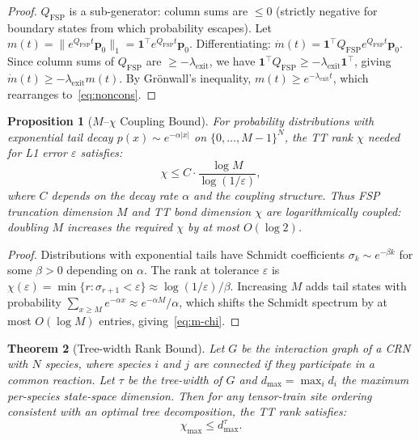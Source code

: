 \documentclass[11pt]{article}
\newtheorem{theorem}{Theorem}
\newtheorem{proposition}[theorem]{Proposition}
\newcommand{\norm}[1]{\lVert #1 \rVert}
\newcommand{\eps}{\varepsilon}
\begin{document}
\begin{proof}
$Q_{\mathrm{FSP}}$ is a sub-generator: column sums are $\leq 0$
(strictly negative for boundary states from which probability escapes).
Let $m(t) = \norm{e^{Q_{\mathrm{FSP}} t}\mathbf{p}_0}_1
= \mathbf{1}^\top e^{Q_{\mathrm{FSP}} t}\mathbf{p}_0$.
Differentiating: $\dot{m}(t) = \mathbf{1}^\top Q_{\mathrm{FSP}}
e^{Q_{\mathrm{FSP}} t}\mathbf{p}_0$.
Since column sums of $Q_{\mathrm{FSP}}$ are $\geq -\lambda_{\mathrm{exit}}$,
we have $\mathbf{1}^\top Q_{\mathrm{FSP}} \geq -\lambda_{\mathrm{exit}}
\mathbf{1}^\top$, giving $\dot{m}(t) \geq -\lambda_{\mathrm{exit}} m(t)$.
By Gr\"onwall's inequality, $m(t) \geq e^{-\lambda_{\mathrm{exit}} t}$,
which rearranges to~\eqref{eq:noncons}.
\end{proof}

\begin{proposition}[$M$--$\chi$ Coupling Bound]\label{prop:m-chi}
For probability distributions with exponential tail decay
$p(x) \sim e^{-\alpha|x|}$ on $\{0,\ldots,M{-}1\}^N$,
the TT rank $\chi$ needed for L1 error $\eps$ satisfies:
\begin{equation}\label{eq:m-chi}
  \chi \leq C \cdot \frac{\log M}{\log(1/\eps)},
\end{equation}
where $C$ depends on the decay rate $\alpha$ and the coupling
structure.
Thus FSP truncation dimension $M$ and TT bond dimension $\chi$
are \emph{logarithmically coupled}: doubling $M$ increases the
required $\chi$ by at most $O(\log 2)$.
\end{proposition}

\begin{proof}
Distributions with exponential tails have Schmidt coefficients
$\sigma_k \sim e^{-\beta k}$ for some $\beta > 0$ depending on
$\alpha$.
The rank at tolerance $\eps$ is
$\chi(\eps) = \min\{r : \sigma_{r+1} < \eps\}
\approx \log(1/\eps)/\beta$.
Increasing $M$ adds tail states with probability
$\sum_{x \geq M} e^{-\alpha x} \approx e^{-\alpha M}/\alpha$,
which shifts the Schmidt spectrum by at most
$O(\log M)$ entries, giving~\eqref{eq:m-chi}.
\end{proof}

\begin{theorem}[Tree-width Rank Bound]\label{thm:treewidth}
Let $G$ be the interaction graph of a CRN with $N$ species,
where species $i$ and $j$ are connected if they participate in
a common reaction.
Let $\tau$ be the tree-width of $G$ and
$d_{\max} = \max_i d_i$ the maximum per-species state-space
dimension.
Then for any tensor-train site ordering consistent with an
optimal tree decomposition, the TT rank satisfies:
\begin{equation}\label{eq:tw-rank}
  \chi_{\max} \leq d_{\max}^{\tau}.
\end{equation}
\end{theorem}
\end{document}
